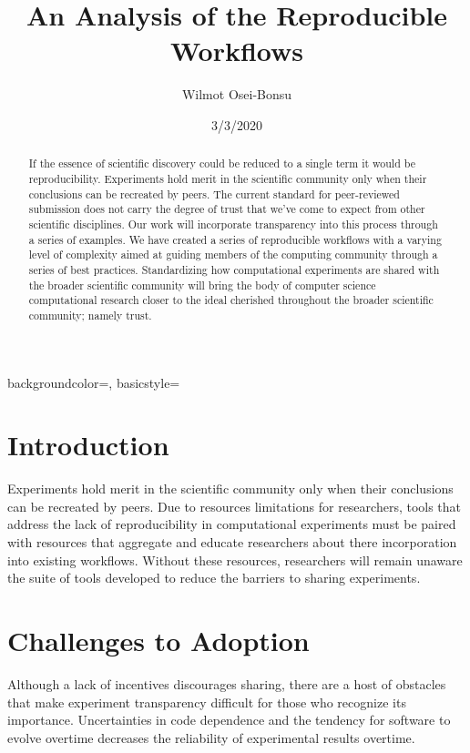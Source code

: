 \documentclass{IEEEtran}
\title{An Analysis of the Reproducible Workflows}
\author{Wilmot Osei-Bonsu}
\date{3/3/2020}
\begin{document}

\maketitle
\pagestyle{plain}
{
    backgroundcolor=\color{white},
    basicstyle=\scriptsize\color{black}\ttfamily
}
\newcommand{\code}[1]{\colorbox{light-gray}{\texttt{#1}}}

\begin{abstract}
    If the essence of scientific discovery could be reduced to a single term it would be reproducibility. Experiments hold merit in the scientific community only when their conclusions can be recreated by peers. The current standard for peer-reviewed submission does not carry the degree of trust that we’ve come to expect from other scientific disciplines. Our work will incorporate transparency into this process through a series of examples. We have created a series of reproducible workflows with a varying level of complexity aimed at guiding members of the computing community through a series of best practices. Standardizing how computational experiments are shared with the broader scientific community will bring the body of computer science computational research closer to the ideal cherished throughout the broader scientific community; namely trust.
\end{abstract}

\tableofcontents

\listoffigures

\clearpage

\section{Introduction}

Experiments hold merit in the scientific community only when their conclusions can be recreated by peers. Due to resources limitations for researchers, tools that address the lack of reproducibility in computational experiments must be paired with resources that aggregate and educate researchers about there incorporation into existing workflows. Without these resources, researchers will remain unaware the suite of tools developed to reduce the barriers to sharing experiments.

\section{Challenges to Adoption }
Although a lack of incentives discourages sharing, there are a host of obstacles that make experiment transparency difficult for those who recognize its importance. Uncertainties in code dependence and the tendency for software to evolve overtime decreases the reliability of experimental results overtime.
\end{document}
